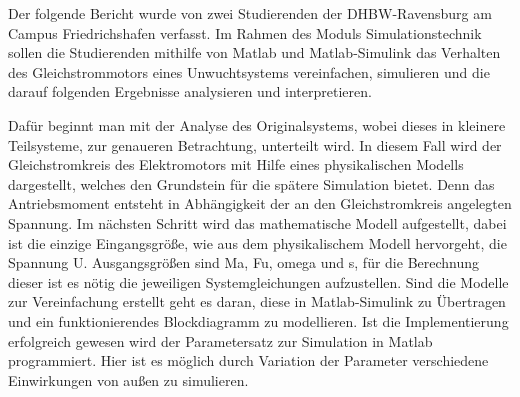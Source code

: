 \label{kurzfassung}

Der folgende Bericht wurde von zwei Studierenden der \ac{DHBW}-Ravensburg am Campus Friedrichshafen verfasst. Im Rahmen des Moduls Simulationstechnik sollen die Studierenden mithilfe von Matlab und Matlab-Simulink das Verhalten des Gleichstrommotors eines Unwuchtsystems vereinfachen, simulieren und die darauf folgenden Ergebnisse analysieren und interpretieren.

Dafür beginnt man mit der Analyse des Originalsystems, wobei dieses in kleinere Teilsysteme, zur genaueren Betrachtung, unterteilt wird. In diesem Fall wird der Gleichstromkreis des Elektromotors mit Hilfe eines physikalischen Modells dargestellt, welches den Grundstein für die spätere Simulation bietet. Denn das Antriebsmoment entsteht in Abhängigkeit der an den Gleichstromkreis angelegten Spannung. Im nächsten Schritt wird das mathematische Modell aufgestellt, dabei ist die einzige Eingangsgröße, wie aus dem physikalischem Modell hervorgeht, die Spannung U. Ausgangsgrößen sind Ma, Fu, omega und s, für die Berechnung dieser ist es nötig die jeweiligen Systemgleichungen aufzustellen. Sind die Modelle zur Vereinfachung erstellt geht es daran, diese in Matlab-Simulink zu Übertragen und ein funktionierendes Blockdiagramm zu modellieren. Ist die Implementierung erfolgreich gewesen wird der Parametersatz zur Simulation in Matlab programmiert. Hier ist es möglich durch Variation der Parameter verschiedene Einwirkungen von außen zu simulieren.